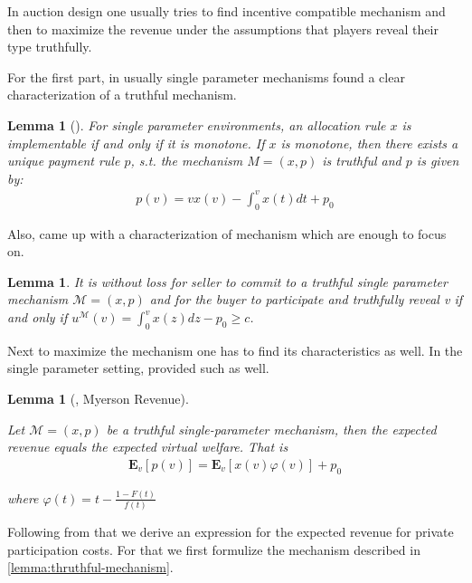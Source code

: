 \documentclass[11pt,a4paper]{article}
\newtheorem{lemma}[theorem]{Lemma}
\newcommand{\1}[1]{\mbox{\rm\bf 1}_{#1}}
\begin{document}
\begin{section}{}
 In auction design one usually tries to find incentive compatible mechanism and then to maximize the revenue under the assumptions that players reveal their type truthfully.

 For the first part, in usually single parameter mechanisms \cite{myerson} found a clear characterization of a truthful mechanism.

 \begin{lemma}[\cite{myerson}]
     For single parameter environments, an allocation rule $x$ is implementable if and only if it is monotone.
     If $x$ is monotone, then there exists a unique payment rule $p$, s.t. the mechanism $M=(x,p)$ is truthful
     and $p$ is given by:
     \begin{align*}
         p(v) = v x(v) - \int_0^v x(t) dt + p_0
     \end{align*}
 \end{lemma}

 Also, \cite{primary} came up with a characterization of mechanism which are enough to focus on.

 \begin{lemma}{\cite{primary}}
     \label{lemma:thruthful-mechanism}
     It is without loss for seller to commit to a truthful single parameter mechanism $\mathcal{M}=(x,p)$ and
     for the buyer to participate and truthfully reveal v if and only if $u^\mathcal{M}(v) = \int_0^v x(z)dz - p_0 \geq c$.
 \end{lemma}

 Next to maximize the mechanism one has to find its characteristics as well.
 In the single parameter setting, \cite{myerson} provided such as well.

 \begin{lemma}[\cite{myerson}, Myerson Revenue]
     \label{lemma:myerson-revenue}

     Let $\mathcal{M}=(x,p)$ be a truthful single-parameter mechanism, then the expected revenue equals the expected virtual welfare. That is
     \begin{align*}
         \mathbf{E}_v\left[p(v)\right]
         = \mathbf{E}_v\left[x(v)\varphi(v)\right] + p_0
     \end{align*}

     where $\varphi(t) = t - \frac{1 - F(t)}{f(t)}$
 \end{lemma}

 Following from that we derive an expression for the expected revenue for private participation costs.
 For that we first formulize the mechanism described in \autoref{lemma:thruthful-mechanism}.


\end{section}
\end{document}
